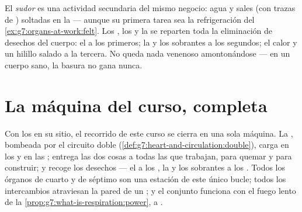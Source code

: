 \begin{remark}\label{rem:g7:removing-wastes:sweat}
El \emph{sudor} es una actividad secundaria del mismo
negocio: agua y sales (con trazas de ) soltadas en la  ---
aunque su primera tarea sea la refrigeración del
\cref{ex:g7:organs-at-work:felt}. Los , los  y la 
se reparten toda la eliminación de desechos del cuerpo: el  a los primeros; la  y los sobrantes a los segundos; el
calor y un hilillo salado a la tercera. No queda nada venenoso
amontonándose --- en un cuerpo sano, la basura no gana nunca.
\end{remark}

\section{La máquina del curso, completa}

\begin{proposition}\label{prop:g7:removing-wastes:complete}
Con los  en su sitio, el recorrido de este curso se cierra en
una sola máquina. La , bombeada por el circuito doble
(\cref{def:g7:heart-and-circulation:double}), carga  en los
 y  en las ; entrega las dos cosas a
todas las  que trabajan, para quemar y para construir; y recoge
los desechos --- el  a los , la  y los
sobrantes a los . Todos los órganos de cuarto y de séptimo son
una estación de este único bucle; todos los intercambios atraviesan la
pared de un ; y el conjunto funciona con el fuego lento de la
\cref{prop:g7:what-is-respiration:power},  a .
\end{proposition}
\admitted

